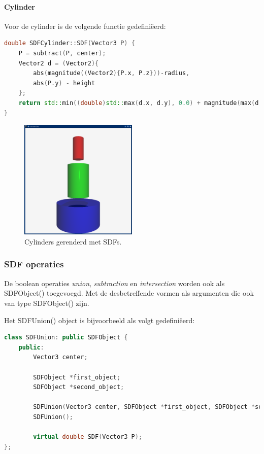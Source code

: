 \documentclass[12pt, a4paper]{article}
\begin{document}
\paragraph{Cylinder}
Voor de cylinder is de volgende functie gedefiniëerd:
\begin{lstlisting}[language=C++]
double SDFCylinder::SDF(Vector3 P) {
    P = subtract(P, center);
    Vector2 d = (Vector2){
        abs(magnitude((Vector2){P.x, P.z}))-radius,
        abs(P.y) - height
    };
    return std::min((double)std::max(d.x, d.y), 0.0) + magnitude(max(d, 0.0));
}
\end{lstlisting}


\begin{figure}[H]
    \centering
    \includegraphics[width=0.50\textwidth]{renders/cylinders.png}
    \caption{Cylinders gerenderd met SDFs.}
    \label{fig:cylinders}
\end{figure}


\subsubsection{SDF operaties}

De boolean operaties \emph{union}, \emph{subtraction} en \emph{intersection} worden ook als SDFObject() toegevoegd. Met de desbetreffende vormen als argumenten die ook van type SDFObject() zijn.

Het SDFUnion() object is bijvoorbeeld als volgt gedefiniëerd:

\begin{lstlisting}[language=C++]
class SDFUnion: public SDFObject {
    public:
        Vector3 center;
        
        SDFObject *first_object;
        SDFObject *second_object;

        SDFUnion(Vector3 center, SDFObject *first_object, SDFObject *second_object, ObjectMaterial material);
        SDFUnion();

        virtual double SDF(Vector3 P);
};
\end{lstlisting}
\end{document}
